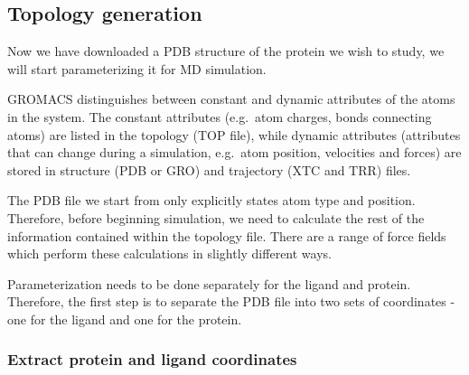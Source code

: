 \documentclass[twocolumn]{bmcart}%
\begin{document}
\hypertarget{topology-generation}{%
\subsection{Topology generation}\label{topology-generation}}

Now we have downloaded a PDB structure of the protein we wish to study,
we will start parameterizing it for MD simulation.

GROMACS distinguishes between constant and dynamic attributes of the
atoms in the system. The constant attributes (e.g.~atom charges, bonds
connecting atoms) are listed in the topology (TOP file), while dynamic
attributes (attributes that can change during a simulation, e.g.~atom
position, velocities and forces) are stored in structure (PDB or GRO)
and trajectory (XTC and TRR) files.

The PDB file we start from only explicitly states atom type and
position. Therefore, before beginning simulation, we need to calculate
the rest of the information contained within the topology file. There
are a range of force fields which perform these calculations in slightly
different ways.

Parameterization needs to be done separately for the ligand and protein.
Therefore, the first step is to separate the PDB file into two sets of
coordinates - one for the ligand and one for the protein.

\hypertarget{extract-protein-and-ligand-coordinates}{%
\subsubsection{Extract protein and ligand
coordinates}\label{extract-protein-and-ligand-coordinates}}
\end{document}
